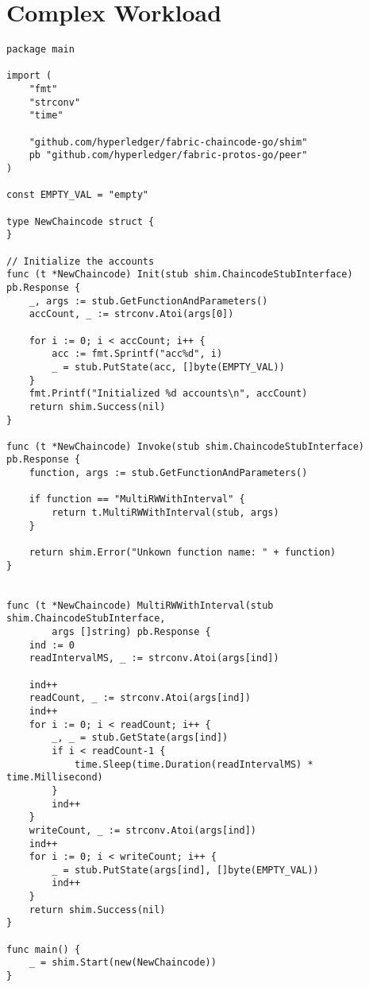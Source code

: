 \section{Complex Workload}
\label{sec:append:contracts:complex}
\begin{lstlisting}
package main

import (
	"fmt"
	"strconv"
	"time"

	"github.com/hyperledger/fabric-chaincode-go/shim"
	pb "github.com/hyperledger/fabric-protos-go/peer"
)

const EMPTY_VAL = "empty"

type NewChaincode struct {
}

// Initialize the accounts
func (t *NewChaincode) Init(stub shim.ChaincodeStubInterface) pb.Response {
	_, args := stub.GetFunctionAndParameters()
	accCount, _ := strconv.Atoi(args[0])

	for i := 0; i < accCount; i++ {
		acc := fmt.Sprintf("acc%d", i)
		_ = stub.PutState(acc, []byte(EMPTY_VAL))
	}
	fmt.Printf("Initialized %d accounts\n", accCount)
	return shim.Success(nil)
}

func (t *NewChaincode) Invoke(stub shim.ChaincodeStubInterface) pb.Response {
	function, args := stub.GetFunctionAndParameters()

	if function == "MultiRWWithInterval" {
		return t.MultiRWWithInterval(stub, args)
	}

	return shim.Error("Unkown function name: " + function)
}


func (t *NewChaincode) MultiRWWithInterval(stub shim.ChaincodeStubInterface, 
		args []string) pb.Response {
	ind := 0
	readIntervalMS, _ := strconv.Atoi(args[ind])

	ind++
	readCount, _ := strconv.Atoi(args[ind])	
	ind++
	for i := 0; i < readCount; i++ {
		_, _ = stub.GetState(args[ind])
		if i < readCount-1 {
			time.Sleep(time.Duration(readIntervalMS) * time.Millisecond)
		}
		ind++
	}
	writeCount, _ := strconv.Atoi(args[ind])	
	ind++
	for i := 0; i < writeCount; i++ {
		_ = stub.PutState(args[ind], []byte(EMPTY_VAL))
		ind++
	}
	return shim.Success(nil)
}

func main() {
	_ = shim.Start(new(NewChaincode))
}

\end{lstlisting}
